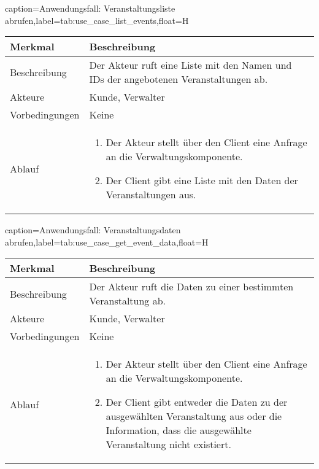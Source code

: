 \begin{dhbwtable}{caption={Anwendungsfall: Veranstaltungsliste abrufen},label=tab:use_case_list_events,float=H}
    \begin{tabularx}{\textwidth}{lX}
        \toprule
        \textbf{Merkmal} & \textbf{Beschreibung}  \\ \midrule
        Beschreibung    & Der Akteur ruft eine Liste mit den Namen und IDs der angebotenen Veranstaltungen ab. \\
        Akteure         & Kunde, Verwalter \\
        Vorbedingungen  & Keine \\
        Ablauf          & \begin{minipage}[t]{\linewidth}
        \begin{enumerate}[leftmargin=*,nosep,after=\strut]
            \item Der Akteur stellt über den Client eine Anfrage an die Verwaltungskomponente.
            \item Der Client gibt eine Liste mit den Daten der Veranstaltungen aus.
        \end{enumerate} 
        \end{minipage}\\\bottomrule
    \end{tabularx}    
\end{dhbwtable}

\begin{dhbwtable}{caption={Anwendungsfall: Veranstaltungsdaten abrufen},label=tab:use_case_get_event_data,float=H}
    \begin{tabularx}{\textwidth}{lX}
        \toprule
        \textbf{Merkmal} & \textbf{Beschreibung}  \\ \midrule
        Beschreibung    & Der Akteur ruft die Daten zu einer bestimmten Veranstaltung ab. \\
        Akteure         & Kunde, Verwalter \\
        Vorbedingungen  & Keine \\
        Ablauf          & \begin{enumerate}
            \item Der Akteur stellt über den Client eine Anfrage an die Verwaltungskomponente.
            \item Der Client gibt entweder die Daten zu der ausgewählten Veranstaltung aus oder die Information, dass die ausgewählte Veranstaltung nicht existiert.
        \end{enumerate} \\\bottomrule
    \end{tabularx}    
\end{dhbwtable}

